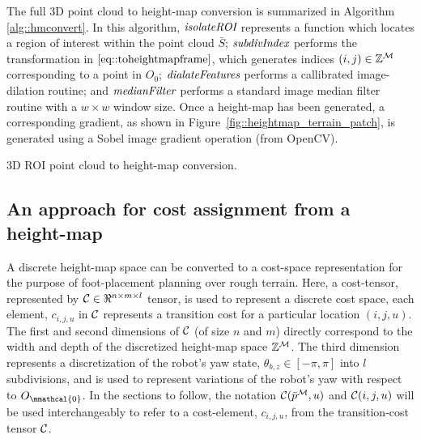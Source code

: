 			The full 3D point cloud to height-map conversion is summarized in Algorithm \ref{alg::hmconvert}. In this algorithm, $\emph{\text{isolateROI}}$ represents a function which locates a region of interest within the point cloud $\bar{S}$; $\emph{\text{subdivIndex}}$ performs the transformation in $\ref{eq::toheightmapframe}$, which generates indices $(i,j)\in{\Bbb Z}^{{\cal M}}$ corresponding to a point in $O_{0}$; $\emph{\text{dialateFeatures}}$ performs a callibrated image-dilation routine; and $\emph{\text{medianFilter}}$ performs a standard image median filter routine with a $w\times w$ window size. Once a height-map has been generated, a corresponding gradient, as shown in Figure~\ref{fig::heightmap_terrain_patch}, is generated using a Sobel image gradient operation (from OpenCV).
			\begin{algorithm}[!h]
				\begin{algorithmic}
						\EndIf
					\EndFor
				\end{algorithmic}	
				\caption{3D ROI point cloud to height-map conversion.}
				\label{alg::hmconvert}
			\end{algorithm}






		\subsection{An approach for cost assignment from a height-map}

			A discrete height-map space can be converted to a cost-space representation for the purpose of foot-placement planning over rough terrain. Here, a cost-tensor, represented by ${\cal C}\in\Re^{n\times m\times l}$ tensor, is used to represent a discrete cost space, \IE each element, $c_{i,j,u}$ in ${\cal C}$ represents a transition cost for a particular location $(i,j,u)$. The first and second dimensions of ${\cal C}$ (of size $n$ and $m$) directly correspond to the width and depth of the discretized height-map space $\mathbb{Z}^{{\cal M}}$. The third dimension represents a discretization of the robot's yaw state, $\theta_{b,z}\in[-\pi,\pi]$ into $l$ subdivisions, and is used to represent variations of the robot's yaw with respect to $O_{\mmathcal{0}}$.  In the sections to follow, the notation ${\cal C}(\bar{p}^{{\cal M}},u)$ and ${\cal C}(i,j,u)$ will be used interchangeably to refer to a cost-element, $c_{i,j,u}$, from the transition-cost tensor ${\cal C}$.


